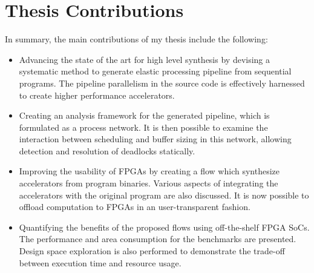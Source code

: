 


\section{Thesis Contributions}

In summary, the main contributions of my thesis include the following:
\begin{itemize}
    \item Advancing the state of the art for high level synthesis by devising a systematic
    method to generate elastic processing pipeline from sequential programs. The pipeline
    parallelism in the source code is effectively harnessed to create higher performance
    accelerators.
    \item Creating an analysis framework for the generated pipeline, which is formulated as a process network. It is then possible to examine the interaction between scheduling and buffer sizing in this network, allowing detection and resolution of deadlocks statically.
    \item Improving the usability of FPGAs by creating a flow which synthesize
    accelerators from program binaries. Various aspects of integrating the accelerators with the original program are also discussed. It is now possible to offload computation to FPGAs in an user-transparent fashion.
    \item Quantifying the benefits of the proposed flows using off-the-shelf FPGA SoCs. The
    performance and area consumption for the benchmarks are presented. Design space exploration is also performed to demonstrate the trade-off between execution time and resource usage.
    
    
\end{itemize}


